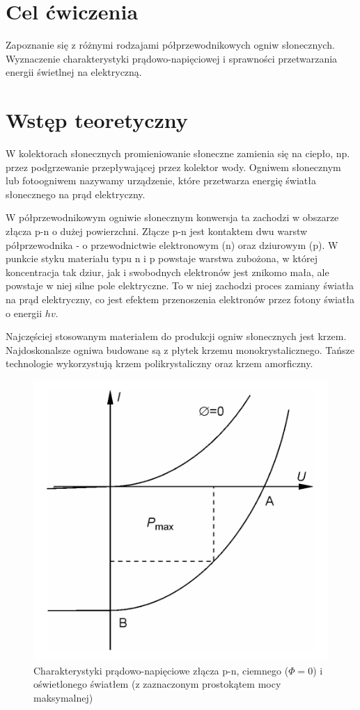 \documentclass{fizykalab}
\begin{document}
\maketitle
\section{Cel ćwiczenia}
Zapoznanie się z różnymi rodzajami półprzewodnikowych ogniw słonecznych.
Wyznaczenie charakterystyki prądowo-napięciowej i sprawności przetwarzania energii
świetlnej na elektryczną.

\section{Wstęp teoretyczny}
W kolektorach słonecznych promieniowanie słoneczne zamienia się na ciepło, np. przez
podgrzewanie przepływającej przez kolektor wody. Ogniwem słonecznym lub fotoogniwem
nazywamy urządzenie, które przetwarza energię światła słonecznego na prąd elektryczny.

W półprzewodnikowym ogniwie słonecznym konwersja ta zachodzi w obszarze
złącza p-n o dużej powierzchni.
Złącze p-n jest kontaktem dwu warstw półprzewodnika - o przewodnictwie elektronowym (n)
oraz dziurowym (p). W punkcie styku materiału typu n i p powstaje warstwa zubożona, w której
koncentracja tak dziur, jak i swobodnych elektronów jest znikomo mała, ale powstaje w niej silne
pole elektryczne. To w niej zachodzi proces zamiany światła na prąd elektryczny, co jest efektem
przenoszenia elektronów przez fotony światła o energii $hv$.

Najczęściej stosowanym materiałem do produkcji ogniw słonecznych jest krzem. Najdoskonalsze ogniwa budowane są z płytek krzemu monokrystalicznego. Tańsze technologie wykorzystują
krzem polikrystaliczny oraz krzem amorficzny.

\begin{figure}[H]
    \centering
    \includegraphics[width=0.3\linewidth]{image.png}
    \caption{
    Charakterystyki prądowo-napięciowe złącza p-n, ciemnego ($\Phi = 0$) i oświetlonego światłem (z zaznaczonym prostokątem mocy maksymalnej)}
    \label{fig:wykres-1}
\end{figure}
\end{document}
